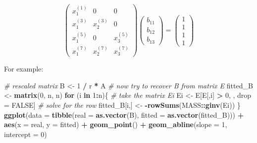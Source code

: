 \documentclass[]{book}
\newenvironment{Shaded}{\begin{snugshade}}{\end{snugshade}}
\newcommand{\CommentTok}[1]{\textcolor[rgb]{0.56,0.35,0.01}{\textit{#1}}}
\newcommand{\ControlFlowTok}[1]{\textcolor[rgb]{0.13,0.29,0.53}{\textbf{#1}}}
\newcommand{\DataTypeTok}[1]{\textcolor[rgb]{0.13,0.29,0.53}{#1}}
\newcommand{\DecValTok}[1]{\textcolor[rgb]{0.00,0.00,0.81}{#1}}
\newcommand{\KeywordTok}[1]{\textcolor[rgb]{0.13,0.29,0.53}{\textbf{#1}}}
\newcommand{\NormalTok}[1]{#1}
\newcommand{\OperatorTok}[1]{\textcolor[rgb]{0.81,0.36,0.00}{\textbf{#1}}}
\newcommand{\OtherTok}[1]{\textcolor[rgb]{0.56,0.35,0.01}{#1}}
\newcommand{\StringTok}[1]{\textcolor[rgb]{0.31,0.60,0.02}{#1}}
\begin{document}
\[
\begin{pmatrix}
x_1^{(1)} & 0 & 0 \\
x_1^{(3)} & x_2^{(3)} & 0 \\
x_1^{(5)} & 0 & x_3^{(5)} \\
x_1^{(7)} & x_2^{(7)} & x_3^{(7)} 
\end{pmatrix} 
\begin{pmatrix}
b_{11}\\
b_{12}\\
b_{13}
\end{pmatrix} 
= 
\begin{pmatrix}
1\\
1\\
1\\
1
\end{pmatrix}
\]

For example:

\begin{Shaded}
\begin{Highlighting}[]
\CommentTok{# rescaled matrix}
\NormalTok{B <-}\StringTok{ }\DecValTok{1} \OperatorTok{/}\StringTok{ }\NormalTok{r }\OperatorTok{*}\StringTok{ }\NormalTok{A}
\CommentTok{# now try to recover B from matrix E}
\NormalTok{fitted_B <-}\StringTok{ }\KeywordTok{matrix}\NormalTok{(}\DecValTok{0}\NormalTok{, n, n)}
\ControlFlowTok{for}\NormalTok{ (i }\ControlFlowTok{in} \DecValTok{1}\OperatorTok{:}\NormalTok{n)\{}
  \CommentTok{# take the matrix Ei}
\NormalTok{  Ei <-}\StringTok{ }\NormalTok{E[E[,i] }\OperatorTok{>}\StringTok{ }\DecValTok{0}\NormalTok{, , drop =}\StringTok{ }\OtherTok{FALSE}\NormalTok{]}
  \CommentTok{# solve for the row}
\NormalTok{  fitted_B[i,] <-}\StringTok{ }\OperatorTok{-}\KeywordTok{rowSums}\NormalTok{(MASS}\OperatorTok{::}\KeywordTok{ginv}\NormalTok{(Ei))}
\NormalTok{\}}
\KeywordTok{ggplot}\NormalTok{(}\DataTypeTok{data =} \KeywordTok{tibble}\NormalTok{(}\DataTypeTok{real =} \KeywordTok{as.vector}\NormalTok{(B),}
                     \DataTypeTok{fitted =} \KeywordTok{as.vector}\NormalTok{(fitted_B))) }\OperatorTok{+}\StringTok{ }
\StringTok{  }\KeywordTok{aes}\NormalTok{(}\DataTypeTok{x =}\NormalTok{ real, }\DataTypeTok{y =}\NormalTok{ fitted) }\OperatorTok{+}\StringTok{ }\KeywordTok{geom_point}\NormalTok{() }\OperatorTok{+}\StringTok{ }
\StringTok{  }\KeywordTok{geom_abline}\NormalTok{(}\DataTypeTok{slope =} \DecValTok{1}\NormalTok{, }\DataTypeTok{intercept =} \DecValTok{0}\NormalTok{)}
\end{Highlighting}
\end{Shaded}
\end{document}
